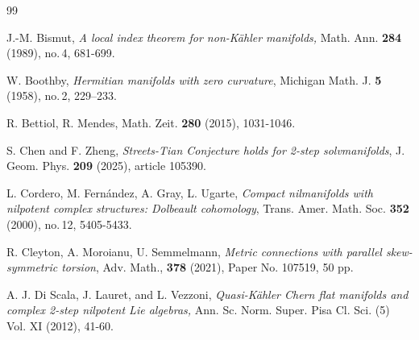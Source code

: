 \documentclass{amsart}
\numberwithin{equation}{section}
\theoremstyle{definition}
\renewcommand{\1}{\mathds{1}}
\renewcommand{\>}{\rightarrow}
\begin{document}
\begin{thebibliography}{99}


 J.-M. Bismut,
\newblock \emph{A local index theorem for non-K\"ahler manifolds,}
\newblock Math. Ann. {\bf 284} (1989), no.\,4, 681-699.

 W. Boothby,
\newblock \textit{Hermitian manifolds with zero curvature},
\newblock Michigan Math. J. {\bf 5} (1958), no.\,2, 229--233.

 R. Bettiol, R. Mendes,
\newblock Math. Zeit. \textbf{280} (2015), 1031-1046.

 S. Chen and F. Zheng, \emph{Streets-Tian Conjecture holds for 2-step solvmanifolds}, J. Geom. Phys. {\bf 209} (2025), article 105390.

 L. Cordero, M. Fern\'{a}ndez, A. Gray, L. Ugarte,
\newblock \textit{Compact nilmanifolds with nilpotent complex structures: Dolbeault cohomology},
\newblock Trans. Amer. Math. Soc. \textbf{352} (2000), no.\,12, 5405-5433.

 R. Cleyton, A. Moroianu, U. Semmelmann,
\newblock \textit{Metric connections with parallel skew-symmetric torsion},
\newblock Adv. Math., \textbf{378} (2021), Paper No. 107519, 50 pp.



  A. J. Di Scala, J. Lauret, and L. Vezzoni,\emph{ Quasi-K\"ahler Chern flat manifolds and complex 2-step nilpotent
Lie algebras,} Ann. Sc. Norm. Super. Pisa Cl. Sci. (5) Vol. XI (2012), 41-60.






\end{thebibliography}
\end{document}
